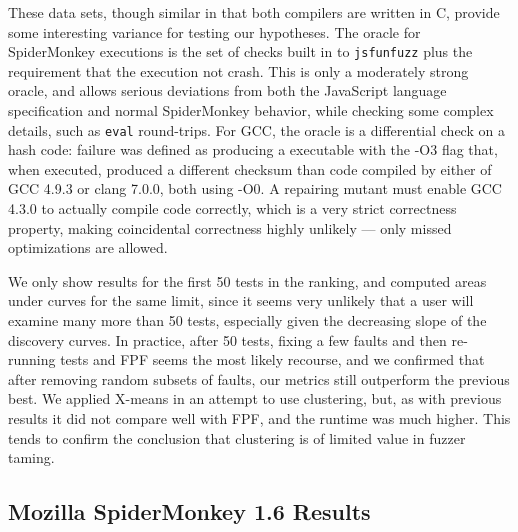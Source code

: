 These data sets, though similar in that both compilers are written in C, provide some interesting variance for testing our hypotheses.  The oracle for SpiderMonkey executions is the set of checks built in to {\tt jsfunfuzz} plus the requirement that the execution not crash.  This is only a moderately strong oracle, and allows serious deviations from both the JavaScript language specification and normal SpiderMonkey behavior, while checking some complex details, such as {\tt eval} round-trips.  For GCC, the oracle is a differential check on a hash code:  failure was defined as producing a executable with the -O3 flag that, when executed, produced a different checksum than code compiled by either of GCC 4.9.3 or clang 7.0.0, both using -O0.  A repairing mutant must enable GCC 4.3.0 to actually compile code correctly, which is a very strict correctness property, making coincidental correctness \cite{CCT} highly unlikely --- only missed optimizations are allowed.

We only show results for the first 50 tests in the ranking, and computed areas under curves for the same limit, since it seems very unlikely that a user will examine many more than 50 tests, especially given the decreasing slope of the discovery curves.  In practice, after 50 tests, fixing a few faults and then re-running tests and FPF seems the most likely recourse, and we confirmed that after removing random subsets of faults, our metrics still outperform the previous best.  We applied X-means \cite{xmeans} in an attempt to use clustering, but, as with previous results \cite{PLDI13} it did not compare well with FPF, and the runtime was much higher.  This tends to confirm the conclusion \cite{PLDI13} that clustering is of limited value in fuzzer taming.

\subsection{Mozilla SpiderMonkey 1.6 Results}


